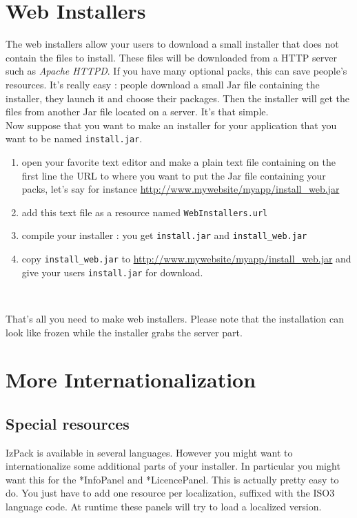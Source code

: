 \section{Web Installers}

The web installers allow your users to download a small installer that does not
contain the files to install. These files will be downloaded from a HTTP server
such as \textit{Apache HTTPD}. If you have many optional packs, this can save
people's resources. It's really easy : people download a small Jar
file containing the installer, they launch it and choose their
packages. Then the installer will get the files from another Jar file
located on a server. It's that simple.\\

Now suppose that you want to make an installer for your application
that you want to be named \texttt{install.jar}.
\begin{enumerate}
  \item open your favorite text editor and make a plain text file
  containing on the first line the URL to where you want to put the
  Jar file containing your packs, let's say for instance
  \url{http://www.mywebsite/myapp/install_web.jar}
  \item add this text file as a resource named
  \texttt{WebInstallers.url}
  \item compile your installer : you get \texttt{install.jar} and
  \texttt{install\_web.jar}
  \item copy \texttt{install\_web.jar} to
  \url{http://www.mywebsite/myapp/install_web.jar} and give your
  users \texttt{install.jar} for download.
\end{enumerate}\

That's all you need to make web installers.
Please note that the installation can look like frozen while the installer
grabs the server part.\\

\section{More Internationalization}

\subsection{Special resources}

IzPack is available in several languages. However you might want to
internationalize some additional parts of your installer. In particular you
might want this for the *InfoPanel and *LicencePanel. This is actually pretty
easy to do. You just have to add one resource per localization, suffixed with the
ISO3 language code. At runtime these panels will try to load a localized version.\\

